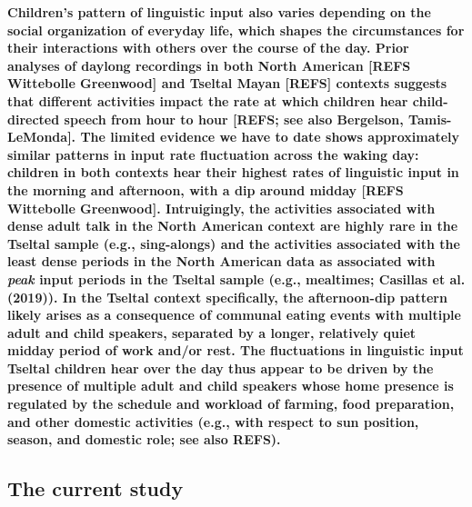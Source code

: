 \documentclass[,man,floatsintext]{apa6}
\begin{document}
\textbf{Children's pattern of linguistic input also varies depending on
the social organization of everyday life, which shapes the circumstances
for their interactions with others over the course of the day. Prior
analyses of daylong recordings in both North American {[}REFS Wittebolle
Greenwood{]} and Tseltal Mayan {[}REFS{]} contexts suggests that
different activities impact the rate at which children hear
child-directed speech from hour to hour {[}REFS; see also Bergelson,
Tamis-LeMonda{]}. The limited evidence we have to date shows
approximately similar patterns in input rate fluctuation across the
waking day: children in both contexts hear their highest rates of
linguistic input in the morning and afternoon, with a dip around midday
{[}REFS Wittebolle Greenwood{]}. Intruigingly, the activities associated
with dense adult talk in the North American context are highly rare in
the Tseltal sample (e.g., sing-alongs) and the activities associated
with the least dense periods in the North American data as associated
with \emph{peak} input periods in the Tseltal sample (e.g., mealtimes;
Casillas et al. (2019)). In the Tseltal context specifically, the
afternoon-dip pattern likely arises as a consequence of communal eating
events with multiple adult and child speakers, separated by a longer,
relatively quiet midday period of work and/or rest. The fluctuations in
linguistic input Tseltal children hear over the day thus appear to be
driven by the presence of multiple adult and child speakers whose home
presence is regulated by the schedule and workload of farming, food
preparation, and other domestic activities (e.g., with respect to sun
position, season, and domestic role; see also REFS).}

\subsection{The current study}\label{the-current-study}
\end{document}
